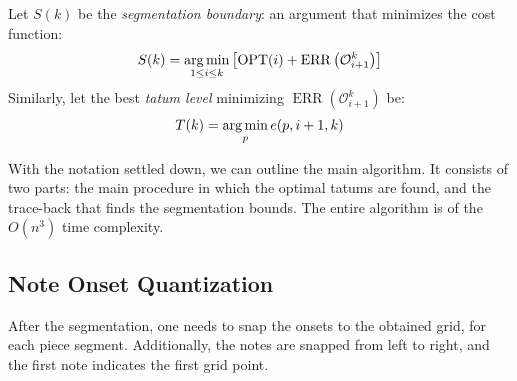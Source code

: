Let $S(k)$ be the \emph{segmentation boundary}: an argument that minimizes the cost function: $$S(k)=\argmin_{1\leq i \leq k}\left[\operatorname{OPT}(i) + \operatorname{ERR}\left(\mathcal{O}_{i+1}^k\right)\right]$$ Similarly, let the best \emph{tatum level} minimizing $\operatorname{ERR}\left(\mathcal{O}_{i+1}^k\right)$ be: $$T(k)=\argmin_{p} e(p,i+1,k)$$ 

With the notation settled down, we can outline the main algorithm. It consists of two parts: the main procedure in which the optimal tatums are found, and the trace-back that finds the segmentation bounds. The entire algorithm is of the $O\left(n^3\right)$ time complexity.



\subsection{Note Onset Quantization}

After the segmentation, one needs to snap the onsets to the obtained grid, for each piece segment. Additionally, the notes are snapped from left to right, and the first note indicates the first grid point. 
